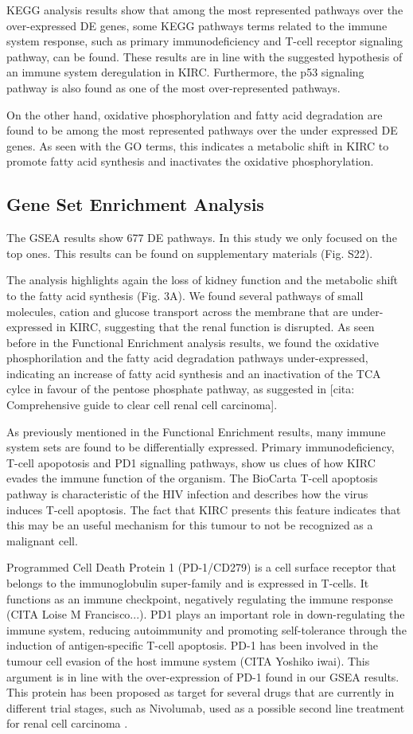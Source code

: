 \documentclass[9pt,twocolumn,twoside]{gsajnl}
\begin{document}
KEGG analysis results show that among the most represented pathways over the over-expressed DE genes, some KEGG pathways terms related to the immune system response, such as primary immunodeficiency and T-cell receptor signaling pathway, can be found.  These results are in line with the suggested hypothesis of an immune system deregulation in KIRC. Furthermore, the p53 signaling pathway is also found as one of the most over-represented pathways.

On the other hand, oxidative phosphorylation and fatty acid degradation are found to be among the most represented pathways over the under expressed DE genes. As seen with the GO terms, this indicates a metabolic shift in KIRC to promote fatty acid synthesis and inactivates the oxidative phosphorylation.

\subsection*{Gene Set Enrichment Analysis}
The GSEA results show 677 DE pathways. In this study we only focused on the top ones. This results can be found on supplementary materials (Fig. S22).


The analysis highlights again the loss of kidney function and the metabolic shift to the fatty acid synthesis  (Fig. 3A). We found several pathways of small molecules, cation and glucose transport across the membrane that are under-expressed in KIRC, suggesting that the renal function is disrupted. As seen before in the Functional Enrichment analysis results, we found the oxidative phosphorilation and the fatty acid degradation pathways under-expressed, indicating an increase of fatty acid synthesis and  an inactivation of the TCA cylce in favour of the pentose phosphate pathway, as suggested in [cita: Comprehensive guide to clear cell renal cell carcinoma]. 

As previously mentioned in the Functional Enrichment results, many immune system sets are found to be differentially expressed. Primary immunodeficiency, T-cell apopotosis and PD1 signalling pathways, show us clues of how KIRC evades the immune function of the organism. The BioCarta T-cell apoptosis pathway is characteristic of the HIV infection and describes how the virus induces T-cell apoptosis. The fact that KIRC presents this feature indicates that this may be an useful mechanism for this tumour to not be recognized as a malignant cell.

Programmed Cell Death Protein 1 (PD-1/CD279) is a cell surface receptor that belongs to the immunoglobulin super-family and is expressed in T-cells. It functions as an immune checkpoint, negatively regulating the immune response (CITA Loise M Francisco...). PD1 plays an important role in down-regulating the immune system, reducing autoimmunity and promoting self-tolerance through the induction of antigen-specific T-cell apoptosis.
PD-1 has been involved in the tumour cell evasion of the host immune system (CITA Yoshiko iwai). This argument is in line with the over-expression of PD-1 found in our GSEA results. This protein has been proposed as target for several drugs that are currently in different trial stages, such as Nivolumab, used as a possible second line treatment for renal cell carcinoma \cite{nivolumab}.
\end{document}
